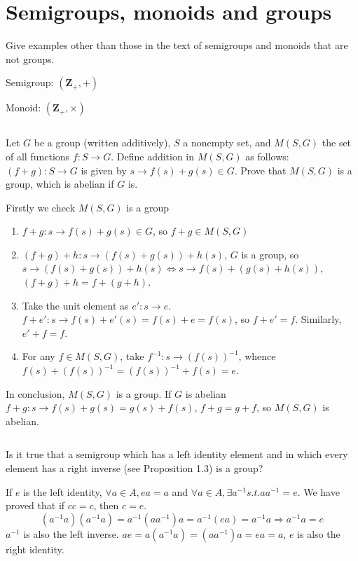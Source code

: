 \section{Semigroups, monoids and groups}
\begin{ex}
    Give examples other than those in the text of semigroups and monoids that are not groups.
\end{ex}

\begin{answer}
    Semigroup: $(\mathbf{Z}_+, +)$

    Monoid: $(\mathbf{Z}_+, \times )$ 
\end{answer}

$$ $$

\begin{ex}
    Let $G$ be a group (written additively), $S$ a nonempty set, and $M(S,G)$ the set of all functions $f: S \rightarrow G$. Define addition in $M(S,G)$ as follows: $(f + g) : S \rightarrow G$ is given by $s \rightarrow f(s) + g(s) \in G$. Prove that $M(S,G)$ is a group, which is abelian if $G$ is.
\end{ex}

\begin{answer}
    Firstly we check $M(S,G)$ is a group
    \begin{enumerate}
        \item $f+g: s\to f(s) + g(s) \in G$, so $f+g\in M(S,G)$
        \item $(f+g)+h: s\to (f(s) + g(s)) + h(s)$, $G$ is a group, so $s\to (f(s) + g(s)) + h(s)\Leftrightarrow s\to f(s) + (g(s) + h(s))$, $(f+g)+h = f+(g+h)$.
        \item Take the unit element as $e': s\to e$. $f+e': s\to f(s)+ e'(s) =f(s)+e=f(s)$, so $f+e'=f$. Similarly, $e'+f = f$.
        \item For any $f\in M(S,G)$, take $f^{-1}: s\to (f(s))^{-1}$, whence $f(s)+(f(s))^{-1}=(f(s))^{-1}+f(s)=e$.
    \end{enumerate}
    In conclusion, $M(S,G)$ is a group. If $G$ is abelian $f+g: s\to f(s)+g(s)=g(s)+f(s)$, $f+g=g+f$, so $M(S,G)$ is abelian.
\end{answer}

$$ $$

\begin{ex}
    Is it true that a semigroup which has a left identity element and in which every element has a right inverse (see Proposition 1.3) is a group?
\end{ex}

\begin{answer}
    If $e$ is the left identity, $\forall a \in A, ea=a$ and $\forall a\in A ,\exists  a^{-1} s.t. aa^{-1}=e$. We have proved that if $cc=c$, then $c=e$. \[(a^{-1}a)(a^{-1}a)=a^{-1}(aa^{-1})a=a^{-1}(ea)=a^{-1}a\Rightarrow a^{-1}a=e\]
    $a^{-1}$ is also the left inverse. $ae=a(a^{-1}a)=(aa^{-1})a=ea=a$, $e$ is also the right identity.
\end{answer}

